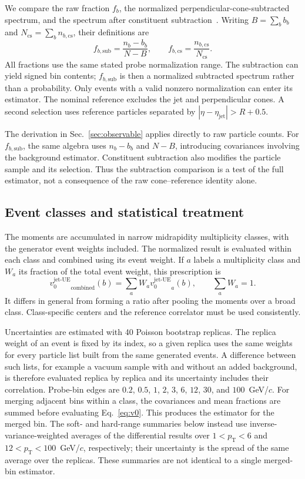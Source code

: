 \documentclass[aps,prc,twocolumn,superscriptaddress,nofootinbib,longbibliography,floatfix,10pt]{revtex4-2}
\newcommand{\pT}{p_{\mathrm T}}
\newcommand{\vjet}{{v_0^{\mathrm{jet\text{-}UE}}}}
\begin{document}
We compare the raw fraction $f_b$, the normalized perpendicular-cone-subtracted spectrum, and the spectrum after constituent subtraction~\cite{Berta}. Writing $B=\sum_b b_b$ and $N_{\mathrm{cs}}=\sum_b n_{b,\mathrm{cs}}$, their definitions are
\begin{equation}
 f_{b,\mathrm{sub}}=\frac{n_b-b_b}{N-B},\qquad
 f_{b,\mathrm{cs}}=\frac{n_{b,\mathrm{cs}}}{N_{\mathrm{cs}}}.
 \label{eq:subtracted}
\end{equation}
All fractions use the same stated probe normalization range. The subtraction can yield signed bin contents; $f_{b,\mathrm{sub}}$ is then a normalized subtracted spectrum rather than a probability. Only events with a valid nonzero normalization can enter its estimator. The nominal reference excludes the jet and perpendicular cones. A second selection uses reference particles separated by $|\eta-\eta_{\mathrm{jet}}|>R+0.5$.

The derivation in Sec.~\ref{sec:observable} applies directly to raw particle counts. For $f_{b,\mathrm{sub}}$, the same algebra uses $n_b-b_b$ and $N-B$, introducing covariances involving the background estimator. Constituent subtraction also modifies the particle sample and its selection. Thus the subtraction comparison is a test of the full estimator, not a consequence of the raw cone--reference identity alone.

\subsection{Event classes and statistical treatment}
The moments are accumulated in narrow midrapidity multiplicity classes, with the generator event weights included. The normalized result is evaluated within each class and combined using its event weight. If $a$ labels a multiplicity class and $W_a$ its fraction of the total event weight, this prescription is
\begin{equation}
 \vjet_{\mathrm{combined}}(b)=\sum_a W_a\vjet_a(b),\qquad \sum_a W_a=1.
 \label{eq:classes}
\end{equation}
It differs in general from forming a ratio after pooling the moments over a broad class. Class-specific centers and the reference correlator must be used consistently.

Uncertainties are estimated with 40 Poisson bootstrap replicas. The replica weight of an event is fixed by its index, so a given replica uses the same weights for every particle list built from the same generated events. A difference between such lists, for example a vacuum sample with and without an added background, is therefore evaluated replica by replica and its uncertainty includes their correlation. Probe-bin edges are $0.2$, $0.5$, $1$, $2$, $3$, $6$, $12$, $30$, and $100$~GeV/$c$. For merging adjacent bins within a class, the covariances and mean fractions are summed before evaluating Eq.~\eqref{eq:v0}. This produces the estimator for the merged bin. The soft- and hard-range summaries below instead use inverse-variance-weighted averages of the differential results over $1<\pT<6$ and $12<\pT<100$~GeV/$c$, respectively; their uncertainty is the spread of the same average over the replicas. These summaries are not identical to a single merged-bin estimator.
\end{document}
